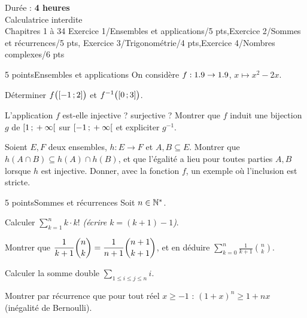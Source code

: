 
  {Durée : \textbf{4 heures}\\Calculatrice interdite\\Chapitres 1 à 3}{4}
  {Exercice 1/Ensembles et applications/5 pts,Exercice 2/Sommes et récurrences/5 pts,%
   Exercice 3/Trigonométrie/4 pts,Exercice 4/Nombres complexes/6 pts}

\begin{exoEval}{5 points}{Ensembles et applications}
On considère $f:1.9\to1.9$, $x\mapsto x^{2}-2x$.
\begin{questions}
  \item Déterminer $f\bigl(\mathopen{[}-1\,{;}\,2\mathclose{]}\bigr)$ et
    $f^{-1}\bigl(\mathopen{[}0\,{;}\,3\mathclose{]}\bigr)$.
  \item L'application $f$ est-elle injective ? surjective ? Montrer que $f$
    induit une bijection $g$ de $\mathopen{[}1\,{;}\,+\infty\mathclose{[}$ sur
    $\mathopen{[}-1\,{;}\,+\infty\mathclose{[}$ et expliciter $g^{-1}$.
  \item Soient $E,F$ deux ensembles, $h:E\to F$ et $A,B\subseteq E$. Montrer
    que $h(A\cap B)\subseteq h(A)\cap h(B)$, et que l'égalité a lieu pour
    toutes parties $A,B$ lorsque $h$ est injective. Donner, avec la fonction
    $f$, un exemple où l'inclusion est stricte.
\end{questions}
\end{exoEval}

\begin{exoEval}{5 points}{Sommes et récurrences}
Soit $n\in\mathbb{N}^{*}$.
\begin{questions}
  \item Calculer $\displaystyle\sum_{k=1}^{n}k\cdot k!$ \emph{(écrire
    $k=(k+1)-1$)}.
  \item Montrer que $\dfrac{1}{k+1}\dbinom nk=\dfrac{1}{n+1}\dbinom{n+1}{k+1}$,
    et en déduire $\displaystyle\sum_{k=0}^{n}\frac{1}{k+1}\binom nk$.
  \item Calculer la somme double $\displaystyle\sum_{1\leqslant i\leqslant j\leqslant n}i$.
  \item Montrer par récurrence que pour tout réel $x\geqslant-1$ :
    $(1+x)^{n}\geqslant1+nx$ (inégalité de Bernoulli).
\end{questions}
\end{exoEval}

